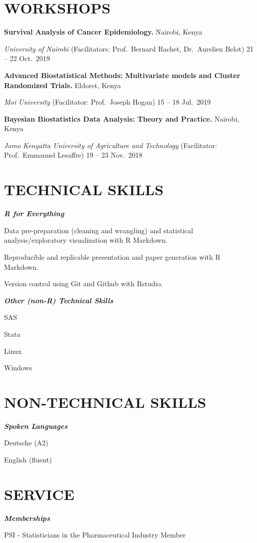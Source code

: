 \documentclass[13pt,]{article}
\providecommand{\tightlist}{%
  \setlength{\itemsep}{0pt}\setlength{\parskip}{0pt}}
\renewenvironment{itemize}{
  \begin{list}{}{
    \setlength{\leftmargin}{1.5em}
  }
}{
  \end{list}
}
\begin{document}
\section{\texorpdfstring{\textbf{WORKSHOPS}}{WORKSHOPS}}\label{workshops}

\textbf{Survival Analysis of Cancer Epidemiology. } \hfill Nairobi,
Kenya

\emph{University of Nairobi} (Facilitators: Prof.~Bernard Rachet,
Dr.~Aurelien Belot) \hfill 21 -- 22 Oct.~2019

\textbf{Advanced Biostatistical Methods: Multivariate models and Cluster
Randomized Trials. } \hfill Eldoret, Kenya

\emph{Moi University} (Facilitator: Prof.~Joseph Hogan) \hfill 15 -- 18
Jul.~2019

\textbf{Bayesian Biostatistics Data Analysis: Theory and Practice. }
\hfill Nairobi, Kenya

\emph{Jomo Kenyatta University of Agriculture and Technology}
(Facilitator: Prof.~Emmanuel Lesaffre) \hfill 19 -- 23 Nov.~2018

\section{\texorpdfstring{\textbf{TECHNICAL
SKILLS}}{TECHNICAL SKILLS}}\label{technical-skills}

\emph{\textbf{R for Everything}}

\begin{itemize}
\tightlist
\item
  Data pre-preparation (cleaning and wrangling) and statistical
  analysis/exploratory visualization with R Markdown.
\item
  Reproducible and replicable presentation and paper generation with R
  Markdown.
\item
  Version control using Git and Github with Rstudio.
\end{itemize}

\emph{\textbf{Other (non-R) Technical Skills}}

\begin{itemize}
\tightlist
\item
  SAS
\item
  Stata
\item
  Linux
\item
  Windows
\end{itemize}

\section{\texorpdfstring{\textbf{NON-TECHNICAL
SKILLS}}{NON-TECHNICAL SKILLS}}\label{non-technical-skills}

\emph{\textbf{Spoken Languages}}

\begin{itemize}
\tightlist
\item
  Deutsche (A2)
\item
  English (fluent)
\end{itemize}

\section{\texorpdfstring{\textbf{SERVICE}}{SERVICE}}\label{service}

\emph{\textbf{Memberships}}

PSI - Statisticians in the Pharmaceutical Industry \hfill Member
\end{document}
